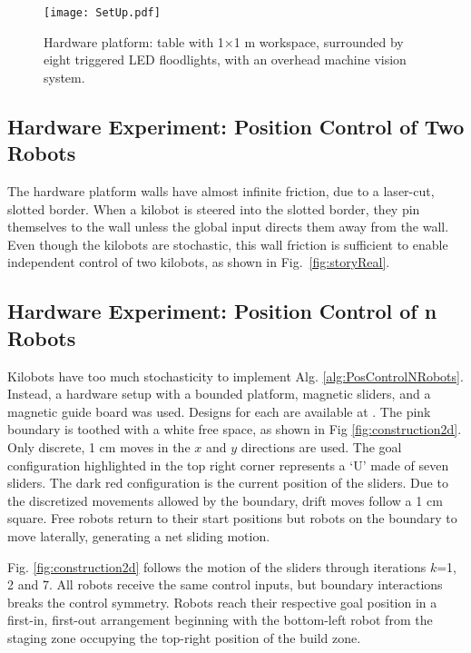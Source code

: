 \begin{figure}
\begin{center}
	\texttt{[image: SetUp.pdf]}
\end{center}
\vspace{-1em}
\caption{\label{fig:setup}
Hardware platform:  table with 1$\times$1 m workspace, surrounded by eight  triggered LED floodlights, with an overhead machine vision system.
}
\vspace{-1em}
\end{figure}
\subsection{Hardware Experiment: Position Control of Two Robots}
The hardware platform walls have almost infinite friction, due to a laser-cut, slotted border. When a kilobot is steered into the slotted border, they pin themselves to the wall unless the global input directs them away from the wall.  Even though the kilobots are stochastic, this wall friction is sufficient to enable independent control of two kilobots, as shown in Fig.~\ref{fig:storyReal}.

\subsection{Hardware Experiment: Position Control of n Robots}
Kilobots have too much stochasticity to implement Alg. \ref{alg:PosControlNRobots}. Instead, a hardware setup with a bounded platform, magnetic sliders, and a magnetic guide board was used.  Designs for each are available at \citep{arunhardware}. The pink boundary is toothed with a white free space, as shown in Fig \ref{fig:construction2d}. Only discrete, 1 cm moves in the $x$ and $y$ directions are used. The goal configuration highlighted in the top right corner represents a `U' made of seven sliders. The dark red configuration is the current position of the sliders. 
Due to the discretized movements allowed by the boundary, drift moves follow a 1 cm square.  Free robots return to their start positions but robots on the boundary to move laterally, generating a net sliding motion.

Fig. \ref{fig:construction2d} follows the motion of the sliders through iterations  $k$=1, 2 and 7. All robots receive the same control inputs, but boundary interactions breaks the control symmetry.  Robots reach their respective goal position in a first-in, first-out arrangement beginning with the bottom-left robot from the staging zone occupying the top-right position of the build zone.

